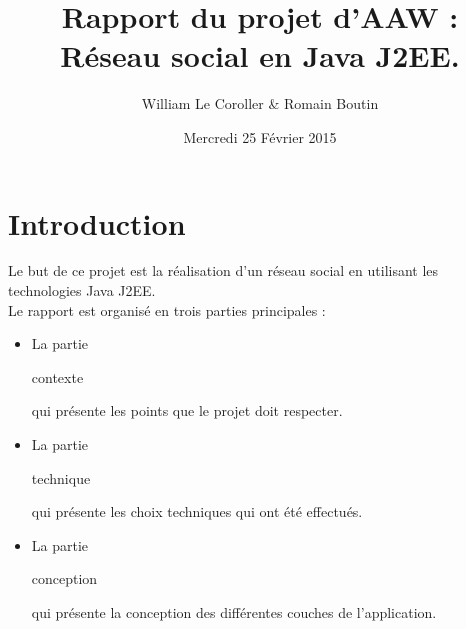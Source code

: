 \documentclass[12pt,a4paper,titlepage]{article}
\title{Rapport du projet d'AAW :\\ 
Réseau social en Java J2EE.}
\author{William Le Coroller \& Romain Boutin}
\date{Mercredi 25 Février 2015}
\begin{document}






\thispagestyle{empty}

\maketitle

\clearpage{\pagestyle{empty}}






\clearpage{\pagestyle{empty}}

\tableofcontents
\clearpage{\pagestyle{empty}}







\clearpage{\pagestyle{empty}}



\section{Introduction}

Le but de ce projet est la réalisation d'un réseau social en utilisant les technologies
Java J2EE.\\

Le rapport est organisé en trois parties principales :
\begin{itemize}
\item La partie \begin{bf}contexte\end{bf} qui présente les points que le projet doit respecter.

\item La partie \begin{bf}technique\end{bf} qui présente les choix techniques qui ont été effectués.

\item La partie \begin{bf}conception\end{bf} qui présente la conception des différentes couches
de l'application.
\end{itemize}
\end{document}
